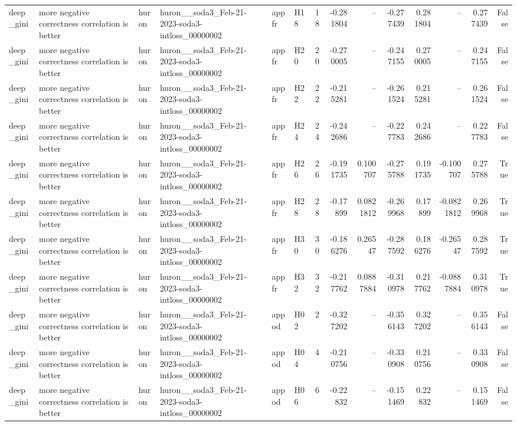 \begin{longtable}{llllllrrrrrrrr}
deep\_gini & more negative correctness correlation is better & huron & huron\_\_soda3\_Feb-21-2023-soda3-intloss\_00000002 & appfr & H18 & 18 & -0.281804 & -- & -0.277439 & 0.281804 & -- & 0.277439 & False \\
deep\_gini & more negative correctness correlation is better & huron & huron\_\_soda3\_Feb-21-2023-soda3-intloss\_00000002 & appfr & H20 & 20 & -0.270005 & -- & -0.247155 & 0.270005 & -- & 0.247155 & False \\
deep\_gini & more negative correctness correlation is better & huron & huron\_\_soda3\_Feb-21-2023-soda3-intloss\_00000002 & appfr & H22 & 22 & -0.215281 & -- & -0.261524 & 0.215281 & -- & 0.261524 & False \\
deep\_gini & more negative correctness correlation is better & huron & huron\_\_soda3\_Feb-21-2023-soda3-intloss\_00000002 & appfr & H24 & 24 & -0.242686 & -- & -0.227783 & 0.242686 & -- & 0.227783 & False \\
deep\_gini & more negative correctness correlation is better & huron & huron\_\_soda3\_Feb-21-2023-soda3-intloss\_00000002 & appfr & H26 & 26 & -0.191735 & 0.100707 & -0.275788 & 0.191735 & -0.100707 & 0.275788 & True \\
deep\_gini & more negative correctness correlation is better & huron & huron\_\_soda3\_Feb-21-2023-soda3-intloss\_00000002 & appfr & H28 & 28 & -0.17899 & 0.0821812 & -0.269968 & 0.17899 & -0.0821812 & 0.269968 & True \\
deep\_gini & more negative correctness correlation is better & huron & huron\_\_soda3\_Feb-21-2023-soda3-intloss\_00000002 & appfr & H30 & 30 & -0.186276 & 0.26547 & -0.287592 & 0.186276 & -0.26547 & 0.287592 & True \\
deep\_gini & more negative correctness correlation is better & huron & huron\_\_soda3\_Feb-21-2023-soda3-intloss\_00000002 & appfr & H32 & 32 & -0.217762 & 0.0887884 & -0.310978 & 0.217762 & -0.0887884 & 0.310978 & True \\
deep\_gini & more negative correctness correlation is better & huron & huron\_\_soda3\_Feb-21-2023-soda3-intloss\_00000002 & appod & H02 & 2 & -0.327202 & -- & -0.356143 & 0.327202 & -- & 0.356143 & False \\
deep\_gini & more negative correctness correlation is better & huron & huron\_\_soda3\_Feb-21-2023-soda3-intloss\_00000002 & appod & H04 & 4 & -0.210756 & -- & -0.330908 & 0.210756 & -- & 0.330908 & False \\
deep\_gini & more negative correctness correlation is better & huron & huron\_\_soda3\_Feb-21-2023-soda3-intloss\_00000002 & appod & H06 & 6 & -0.22832 & -- & -0.151469 & 0.22832 & -- & 0.151469 & False \\

\end{longtable}
